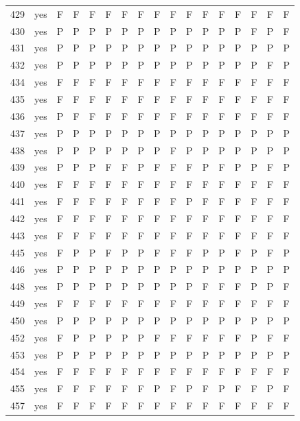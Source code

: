 \begin{table}[p]
\begin{tabular*}{\textwidth}{@{\extracolsep{\fill}}rcccccccccccccccc}
429 & yes & F & F & F & F & F & F & F & F & F & F & F & F & F & F & F\\
430 & yes & P & P & P & P & P & P & P & P & P & P & P & P & F & P & F\\
431 & yes & P & P & P & P & P & P & P & P & P & P & P & P & P & P & P\\
432 & yes & P & P & P & P & P & P & P & P & P & P & P & P & P & F & P\\
434 & yes & F & F & F & F & F & F & F & F & F & F & F & F & F & F & F\\
435 & yes & F & F & F & F & F & F & F & F & F & F & F & F & F & F & F\\
436 & yes & P & F & F & F & F & F & F & F & F & F & F & F & F & F & F\\
437 & yes & P & P & P & P & P & P & P & P & P & P & P & P & P & P & P\\
438 & yes & P & P & P & P & P & P & P & F & P & P & P & P & P & P & P\\
439 & yes & P & P & P & F & F & P & F & F & F & P & F & P & P & F & P\\
440 & yes & F & F & F & F & F & F & F & F & F & F & F & F & F & F & F\\
441 & yes & F & F & F & F & F & F & F & F & P & F & F & F & F & F & F\\
442 & yes & F & F & F & F & F & F & F & F & F & F & F & F & F & F & F\\
443 & yes & F & F & F & F & F & F & F & F & F & F & F & F & F & F & F\\
445 & yes & F & P & P & F & P & P & F & F & F & P & P & F & P & F & P\\
446 & yes & P & P & P & P & P & P & P & P & P & P & P & P & P & P & P\\
448 & yes & P & P & P & P & P & P & P & P & P & F & F & F & P & P & F\\
449 & yes & F & F & F & F & F & F & F & F & F & F & F & F & F & F & F\\
450 & yes & P & P & P & P & P & P & P & P & P & P & P & P & P & P & P\\
452 & yes & F & P & P & P & P & P & F & F & F & F & F & F & P & F & F\\
453 & yes & P & P & P & P & P & P & P & P & P & P & P & P & P & P & P\\
454 & yes & F & F & F & F & F & F & F & F & F & F & F & F & F & F & F\\
455 & yes & F & F & F & F & F & F & P & F & P & F & P & F & F & P & F\\
457 & yes & F & F & F & F & F & F & F & F & F & F & F & F & F & F & F\\
\bottomrule\end{tabular*}\end{table}
\clearpage

